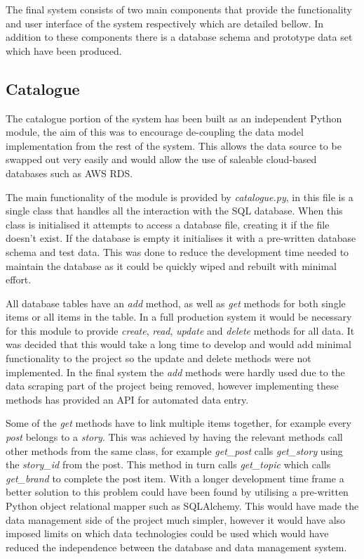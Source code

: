 \documentclass[12pt,titlepage]{article}
\begin{document}
  The final system consists of two main components that provide the
  functionality and user interface of the system respectively which are detailed
  bellow. In addition to these components there is a database schema and
  prototype data set which have been produced.

  \subsection{Catalogue}

  The catalogue portion of the system has been built as an independent Python
  module, the aim of this was to encourage de-coupling the data model
  implementation from the rest of the system. This allows the data source to be
  swapped out very easily and would allow the use of saleable cloud-based
  databases such as AWS RDS.

  The main functionality of the module is provided by \textit{catalogue.py}, in
  this file is a single class that handles all the interaction with the SQL
  database. When this class is initialised it attempts to access a database
  file, creating it if the file doesn't exist. If the database is empty it
  initialises it with a pre-written database schema and test data. This was done
  to reduce the development time needed to maintain the database as it could be
  quickly wiped and rebuilt with minimal effort.

  All database tables have an \textit{add} method, as well as \textit{get}
  methods for both single items or all items in the table. In a full production
  system it would be necessary for this module to provide \textit{create},
  \textit{read}, \textit{update} and \textit{delete} methods for all data. It
  was decided that this would take a long time to develop and would add minimal
  functionality to the project so the update and delete methods were not
  implemented. In the final system the \textit{add} methods were hardly used due
  to the data scraping part of the project being removed, however implementing
  these methods has provided an API for automated data entry.

  Some of the \textit{get} methods have to link multiple items together, for
  example every \textit{post} belongs to a \textit{story}. This was achieved by
  having the relevant methods call other methods from the same class, for
  example \textit{get\_post} calls \textit{get\_story} using the \textit{story\_id}
  from the post. This method in turn calls \textit{get\_topic} which calls
  \textit{get\_brand} to complete the post item. With a longer development
  time frame a better solution to this problem could have been found by utilising
  a pre-written Python object relational mapper such as SQLAlchemy. This would
  have made the data management side of the project much simpler, however it
  would have also imposed limits on which data technologies could be used which
  would have reduced the independence between the database and data management
  system.
\end{document}
